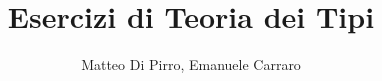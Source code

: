 \author{Matteo Di Pirro, Emanuele Carraro}

\title{Esercizi di Teoria dei Tipi}
\maketitle

\newpage
\tableofcontents
